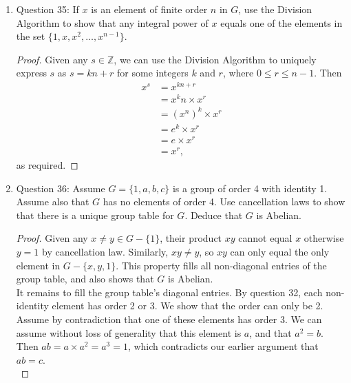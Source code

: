 \documentclass{article}
\begin{document}
\begin{enumerate}
\begin{enumerate}
\begin{proof}
          Since the $n$ elements are distinct, $G$ must have at least $n$
          elements.
        \end{proof}
      \item Question 35: If $x$ is an element of finite order $n$ in $G$,
        use the Division Algorithm to show that any integral power of $x$
        equals one of the elements in the set $\{1,x,x^2,\ldots,x^{n-1}\}$.
        \begin{proof}
          Given any $s\in\mathbb{Z}$, we can use the Division Algorithm to
          uniquely express $s$ as $s=kn+r$ for some integers $k$ and $r$,
          where $0\leq r\leq n-1$. Then
          \begin{align*}
            x^s & = x^{kn+r} \\
                & = x^kn \times x^r \\
                & = (x^n)^k \times x^r \\
                & = e^k \times x^r \\
                & = e \times x^r \\
                & = x^r,
          \end{align*}
          as required.
        \end{proof}
      \item Question 36: Assume $G=\{1,a,b,c\}$ is a group of order 4 with
        identity 1. Assume also that $G$ has no elements of order 4. Use
        cancellation laws to show that there is a unique group table for
        $G$. Deduce that $G$ is Abelian.
        \begin{proof}
          Given any $x\neq y\in G-\{1\}$, their product $xy$ cannot equal
          $x$ otherwise $y=1$ by cancellation law. Similarly, $xy\neq y$,
          so $xy$ can only equal the only element in $G-\{x,y,1\}$. This
          property fills all non-diagonal entries of the group table, and
          also shows that $G$ is Abelian. \\

          It remains to fill the group table's diagonal entries. By
          question 32, each non-identity element has order 2 or 3. We show
          that the order can only be 2. Assume by contradiction that one of
          these elements has order 3. We can assume without loss of
          generality that this element is $a$, and that $a^2=b$. Then
          $ab=a\times a^2 = a^3 = 1$, which contradicts our earlier
          argument that $ab=c$. \\


\end{proof}
\end{enumerate}
\end{enumerate}
\end{document}
